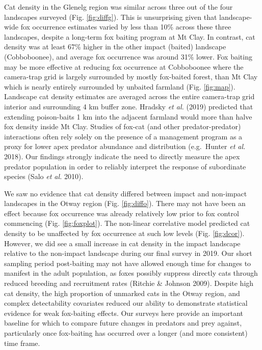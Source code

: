 \documentclass[]{elsarticle} %
\begin{document}
Cat density in the Glenelg region was similar across three out of the four landscapes surveyed (Fig. \ref{fig:diffg}). This is unsurprising given that landscape-wide fox occurrence estimates varied by less than 10\% across these three landscapes, despite a long-term fox baiting program at Mt Clay. In contrast, cat density was at least 67\% higher in the other impact (baited) landscape (Cobboboonee), and average fox occurrence was around 31\% lower. Fox baiting may be more effective at reducing fox occurrence at Cobboboonee where the camera-trap grid is largely surrounded by mostly fox-baited forest, than Mt Clay which is nearly entirely surrounded by unbaited farmland (Fig. \ref{fig:map}). Landscape cat density estimates are averaged across the entire camera-trap grid interior and surrounding 4 km buffer zone. Hradsky \emph{et al.} (2019) predicted that extending poison-baits 1 km into the adjacent farmland would more than halve fox density inside Mt Clay. Studies of fox-cat (and other predator-predator) interactions often rely solely on the presence of a management program as a proxy for lower apex predator abundance and distribution (e.g.~Hunter \emph{et al.} 2018). Our findings strongly indicate the need to directly measure the apex predator population in order to reliably interpret the response of subordinate species (Salo \emph{et al.} 2010).

We saw no evidence that cat density differed between impact and non-impact landscapes in the Otway region (Fig. \ref{fig:diffo}). There may not have been an effect because fox occurrence was already relatively low prior to fox control commencing (Fig. \ref{fig:foxplot}). The non-linear correlative model predicted cat density to be unaffected by fox occurrence at such low levels (Fig. \ref{fig:dcor}). However, we did see a small increase in cat density in the impact landscape relative to the non-impact landscape during our final survey in 2019. Our short sampling period post-baiting may not have allowed enough time for changes to manifest in the adult population, as foxes possibly suppress directly cats through reduced breeding and recruitment rates (Ritchie \& Johnson 2009). Despite high cat density, the high proportion of unmarked cats in the Otway region, and complex detectability covariates reduced our ability to demonstrate statistical evidence for weak fox-baiting effects. Our surveys here provide an important baseline for which to compare future changes in predators and prey against, particularly once fox-baiting has occurred over a longer (and more consistent) time frame.
\end{document}
